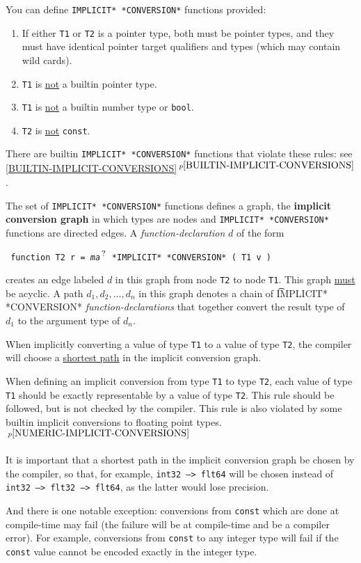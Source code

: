 \documentclass[12pt]{article}
\newcommand{\QMARK}{{$^{\,\mbox{\footnotesize ?}}$}}
\newcommand{\key}[1]{{\rm \bfseries #1}}
\newcommand{\itemref}[1]{\ref{#1}$\,^{p\pageref{#1}}$}
\newcommand{\pagnote}[1]{$\,^{p\pageref{#1}}$}
\newenvironment{indpar}[1][0.3in]%
	{\begin{list}{}%
		     {\setlength{\itemsep}{0in}%
		      \setlength{\topsep}{0in}%
		      \setlength{\parsep}{1ex}%
		      \setlength{\labelwidth}{#1}%
		      \setlength{\leftmargin}{#1}%
		      \addtolength{\leftmargin}{\labelsep}}%
	 \item}%
	{\end{list}}
\begin{document}
You can define {\tt *IMPLICIT* *CONVERSION*} functions provided:
\begin{enumerate}
\item
If either {\tt T1} or {\tt T2} is a pointer type, both must be pointer types,
and they must have identical pointer target qualifiers and types (which
may contain wild cards).
\item
{\tt T1} is \underline{not} a builtin pointer type.
\item
{\tt T1} is \underline{not} a builtin number type or {\tt bool}.
\item
{\tt T2} is \underline{not} {\tt const}.
\end{enumerate}
There are builtin {\tt *IMPLICIT* *CON\-VER\-SION*} functions
that violate these rules: see \itemref{BUILTIN-IMPLICIT-CONVERSIONS}.

The set of {\tt *IMPLICIT* *CONVERSION*} functions defines
a graph, the \key{implicit conversion graph}\label{IMPLICIT-CONVERSION-GRAPH}
in which types are nodes and {\tt *IMPLICIT* *CONVERSION*}
functions are directed edges.
A {\em function-declaration} $d$ of the form
\begin{indpar} \tt
function T2 r = {\em ma}\QMARK{} *IMPLICIT* *CONVERSION* ( T1 v )
\end{indpar}
creates an edge labeled $d$ in this graph from node {\tt T2} to node
{\tt T1}.
This graph \underline{must} be
acyclic.  A path $d_1,d_2,\ldots,d_n$ in this graph denotes a chain
of {\t *IMPLICIT* *CONVERSION*} {\em function-declarations} that together
convert the result type of $d_1$ to the argument type of $d_n$.

When implicitly converting a value of type {\tt T1} to a value of
type {\tt T2}, the compiler will choose a \underline{shortest path}
in the implicit conversion graph.

When defining an implicit conversion from type {\tt T1} to type
{\tt T2}, each value of type {\tt T1} should be exactly representable
by a value of type {\tt T2}.  This rule should be followed, but
is not checked by the compiler.  This rule is also violated by
some builtin implicit conversions to floating
point types.\pagnote{NUMERIC-IMPLICIT-CONVERSIONS}

It is important that a shortest path in the implicit conversion graph
be chosen by the compiler, so that, for example,
{\tt int32 ---> flt64} will be chosen instead of
{\tt int32 ---> flt32 ---> flt64}, as the latter would lose precision.

And there is one notable exception: conversions from {\tt const}
which are done at compile-time may fail (the failure will be at
compile-time and be a compiler error).  For example, conversions
from {\tt const} to any integer type will fail if the {\tt const}
value cannot be encoded exactly in the integer type.
\end{document}
